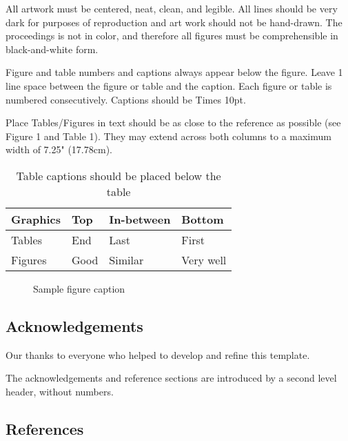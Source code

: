 \documentclass{article} \usepackage{proceed}
\begin{document}
All artwork must be centered, neat, clean, and legible.  All lines
should be very dark for purposes of reproduction and art work should
not be hand-drawn.  The proceedings is not in color, and therefore all
figures must be comprehensible in black-and-white form.

Figure and table numbers and captions always appear below the figure.
Leave 1 line space between the figure or table and the caption.  Each
figure or table is numbered consecutively. Captions should be Times
10pt.

Place Tables/Figures in text should be as close to the reference as
possible (see Figure 1 and Table 1).  They may extend across both
columns to a maximum width of 7.25" (17.78cm).

\begin{table}[htb]
  \begin{center}
    \begin{tabular}{|l|l|l|l|}
      \hline 
      \bf Graphics & \bf Top & \bf In-between & \bf Bottom \\
      \hline
      Tables & End & Last & First \\
      \hline
      Figures & Good & Similar & Very well \\
      \hline
    \end{tabular}
    \caption{Table captions should be placed below the table}
  \end{center}
\end{table}

\begin{figure}[htb] 
  \vspace{1.5in}
  \caption{Sample figure caption} 
\end{figure} 

\subsection*{Acknowledgements} 

Our thanks to everyone who helped to develop and refine this template.

The acknowledgements and reference sections are introduced by a second
level header, without numbers.

\newpage %

\subsection*{References} 
\end{document}
